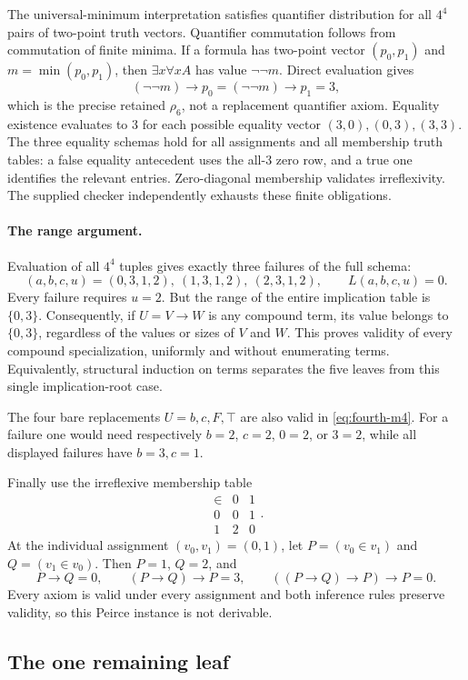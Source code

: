 The universal-minimum interpretation satisfies quantifier distribution
for all $4^4$ pairs of two-point truth vectors.  Quantifier commutation
follows from commutation of finite minima.  If a formula has two-point
vector $(p_0,p_1)$ and $m=\min(p_0,p_1)$, then
$\exists x\forall x A$ has value $\neg\neg m$.  Direct evaluation
gives
\[
 (\neg\neg m)\to p_0=(\neg\neg m)\to p_1=3,
\]
which is the precise retained $\rho_6$, not a replacement quantifier
axiom.  Equality existence evaluates to $3$ for each possible equality
vector $(3,0),(0,3),(3,3)$.  The three equality schemas hold for all
assignments and all membership truth tables: a false equality
antecedent uses the all-$3$ zero row, and a true one identifies the
relevant entries.  Zero-diagonal membership validates irreflexivity.
The supplied checker independently exhausts these finite obligations.

\paragraph{The range argument.}
Evaluation of all $4^4$ tuples gives exactly three failures of the full
schema:
\[
 (a,b,c,u)=(0,3,1,2),\ (1,3,1,2),\ (2,3,1,2),
 \qquad L(a,b,c,u)=0.
\]
Every failure requires $u=2$.  But the range of the entire implication
table is $\{0,3\}$.  Consequently, if $U=V\to W$ is any compound term,
its value belongs to $\{0,3\}$, regardless of the values or sizes of
$V$ and $W$.  This proves validity of every compound specialization,
uniformly and without enumerating terms.  Equivalently, structural
induction on terms separates the five leaves from this single
implication-root case.

The four bare replacements $U=b,c,F,\top$ are also valid in
\eqref{eq:fourth-m4}.  For a failure one would need respectively
$b=2$, $c=2$, $0=2$, or $3=2$, while all displayed failures have
$b=3,c=1$.

Finally use the irreflexive membership table
\[
\begin{array}{c|cc}
 \in&0&1\\\hline
 0&0&1\\
 1&2&0
\end{array}.
\]
At the individual assignment $(v_0,v_1)=(0,1)$, let
$P=(v_0\in v_1)$ and $Q=(v_1\in v_0)$.  Then $P=1$, $Q=2$, and
\[
 P\to Q=0,\qquad (P\to Q)\to P=3,\qquad
 ((P\to Q)\to P)\to P=0.
\]
Every axiom is valid under every assignment and both inference rules
preserve validity, so this Peirce instance is not derivable.

\subsection{The one remaining leaf}

